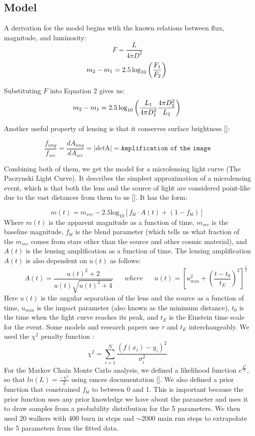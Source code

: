 \documentclass{article}
\begin{document}
\vspace{0.5cm}
\subsection{Model}
A derivation for the model begins with the known relations between  flux, magnitude, and luminosity:
$$
F=\frac{L}{4 \pi D^{2}}
$$
$$
m_{2}-m_{1}=2.5 \log _{10}\left(\frac{F_{1}}{F_{2}}\right) \\
$$


Substituting $F$ into Equation $2$ gives us:
$$
m_{2}-m_{1}=2.5 \log _{10}\left(\frac{L_{1}}{4 \pi D_{1}^{2}} \frac{4 \pi D_{2}^{2}}{L_{2}}\right) \\
$$

Another useful property of lensing is that it conserves surface brightness [\cite{keeton}]:

$$
\frac{f_{img}}{f_{src}} = \frac{dA_{img}}{dA_{src}} = |det\text{A}| = \texttt{Amplification of the image}
$$

Combining both of them, we get the model for a microlensing light curve (The Paczynski Light Curve). It describes the simplest approximation of a microlensing event, which is that both the lens and the source of light are considered point-like due to the vast distances from them to us [\cite{1996}]. It has the form:

$$
m(t) = m_{src} - 2.5 \text{log}_{10} [f_{bl} \cdot A(t) + (1 - f_{bl})]
$$
Where $m(t)$ is the apparent magnitude as a function of time, $m_{src}$ is the baseline magnitude, $f_{bl}$ is the blend parameter (which tells us what fraction of the $m_{src}$ comes from stars other than the source and other cosmic material), and $A(t)$ is the lensing amplification as a function of time. The lensing amplification $A(t)$ is also dependent on $u(t)$ as follows:
$$
\hspace{30pt} A(t) = \frac{u(t)^2 + 2}{u(t)\sqrt{u(t)^2 + 4}} \hspace{20pt} where \hspace{20pt} u(t) = \left[{u^2_{min}} + \left(\frac{t-t_{0}}{t_{E}}\right)^2\right]^\frac{1}{2}
$$
Here $u(t)$ is the angular separation of the lens and the source as a function of time, $u_{min}$ is the impact parameter (also known as the minimum distance), $t_{0}$ is the time when the light curve reaches its peak, and $t_{E}$ is the Einstein time scale for the event. Some models and research papers use ${\tau}$ and $t_{E}$ interchangeably. We used the $\chi^2$ penalty function :
$$
  \chi^2 = \sum_{i=1}^{N} \frac{ (f(x_i) - y_i )^2}{\sigma_i^2}
$$
For the Markov Chain Monte Carlo analysis, we defined a likelihood function $e^{\frac{\chi^2}{2}}$, so that $ln(L) = \frac{-\chi^2}{2}$ using emcee documentation [\cite{emceedocumentation}]. We also defined a prior function that constrained $f_{bl}$ to between 0 and 1. This is important because the prior function uses any prior knowledge we have about the parameter and uses it to draw samples from a probability distribution for the 5 parameters. We then used 20 walkers with 400 burn in steps and $\sim$2000 main run steps to extrapolate the 5 parameters from the fitted data.
\end{document}
